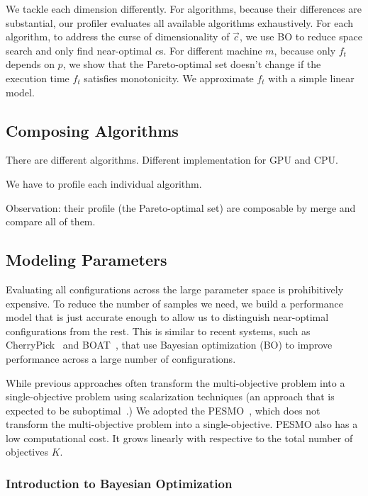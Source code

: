  We tackle each dimension differently. For algorithms,
because their differences are substantial, our profiler evaluates all available
algorithms exhaustively. For each algorithm, to address the curse of
dimensionality of $\vec{c}$, we use BO to reduce space search and only find
near-optimal $c$s. For different machine $m$, because only $f_t$ depends on $p$,
we show that the Pareto-optimal set doesn't change if the execution time $f_t$
satisfies monotonicity. We approximate $f_t$ with a simple linear model.

\subsection{Composing Algorithms}
\label{sec:compose-models}

There are different algorithms. Different implementation for GPU and CPU.

We have to profile each individual algorithm.

Observation: their profile (the Pareto-optimal set) are composable by merge and
compare all of them.

\subsection{Modeling Parameters}
\label{sec:single-platform}

Evaluating all configurations across the large parameter space is prohibitively
expensive. To reduce the number of samples we need, we build a performance model
that is just accurate enough to allow us to distinguish near-optimal
configurations from the rest. This is similar to recent systems, such as
CherryPick~\cite{alipourfard2017cherrypick} and BOAT~\cite{dalibard2017boat},
that use Bayesian optimization (BO) to improve performance across a large number
of configurations.

While previous approaches often transform the multi-objective problem into a
single-objective problem using scalarization techniques (an approach that is
expected to be suboptimal~\cite{knowles2006parego}.) We adopted the
PESMO~\cite{hernandez2016predictive}, which does not transform the
multi-objective problem into a single-objective. PESMO also has a low
computational cost. It grows linearly with respective to the total number of
objectives $K$.

\subsubsection{Introduction to Bayesian Optimization}
\label{sec:bo}

